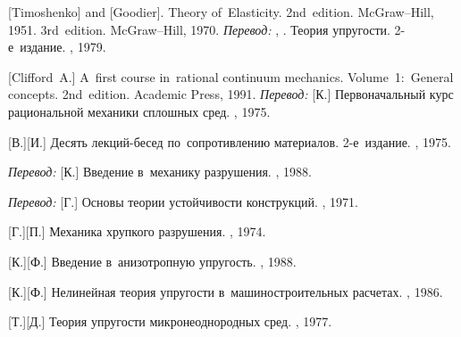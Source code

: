 \begin{thebibliography}{123}
\begin{otherlanguage}{russian}
[Timoshenko] and [Goodier].
Theory of~Elasticity.
2nd~edition. McGraw\hbox{--}Hill, 1951. 
3rd~edition. McGraw\hbox{--}Hill, 1970. 
\emph{Перевод:}
, .
Теория упругости.
2\hbox{-}е~издание.
\naukapublisher, 1979.

[Clifford~A.] A~first course in~rational continuum mechanics. Volume~1:~General concepts. 2nd~edition. Academic Press, 1991.  %
\emph{Перевод:}
[К.] Первоначальный курс рациональной механики сплошных сред. \mirpublisher, 1975. 

[В.][И.]
Десять лекций\hbox{-}бесед по~сопротивлению материалов.
2\hbox{-}е~издание.
\naukapublisher, 1975.

\emph{Перевод:}
[К.]
Введение в~механику разрушения.
\mirpublisher,
1988.

\emph{Перевод:}
[Г.]
Основы теории устойчивости конструкций.
\mirpublisher, 1971.

[Г.][П.]
Механика хрупкого разрушения.
\naukapublisher, 1974.

[К.][Ф.]
Введение в~анизотропную упругость.
\naukapublisher,
1988.

[К.][Ф.]
Нелинейная теория упругости в~машиностроительных расчетах.
\maschinenbauleningraderverlag,
1986.

[Т.][Д.] Теория упругости микронеоднородных сред. \naukapublisher, 1977. 


\end{otherlanguage}
\end{thebibliography}
